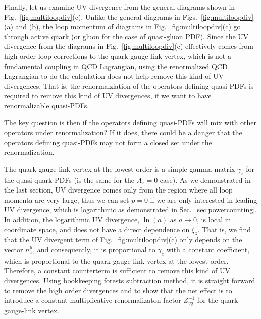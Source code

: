 \documentclass[twocolumn,aps,prd,superscriptaddress,nofootinbib,showpacs]{revtex4}
\begin{document}
Finally, let us examine UV divergence from the general diagrams shown in Fig.~\ref{fig:multiloopdiv}(c). Unlike the general diagrams in Figs.~\ref{fig:multiloopdiv}(a) and (b), the loop momentum of diagrams in Fig.~\ref{fig:multiloopdiv}(c) go through active quark (or gluon for the case of quasi-gluon PDF).  Since the UV divergence from the diagrams in Fig.~\ref{fig:multiloopdiv}(c) effectively comes from high order loop corrections to the quark-gauge-link vertex, which is not a fundamental coupling in QCD Lagrangian, using the renormalized QCD Lagrangian to do the calculation does not help remove this kind of UV divergences.  That is, the renormalziation of the operators defining quasi-PDFs is required to remove this kind of UV divergences, if we want to have renormalizable quasi-PDFs.

The key question is then if the operators defining quasi-PDFs will mix with other operators under renormalization? If it does, there could be a danger that the operators defining quasi-PDFs may not form a closed set under the renormalization.

The quark-gauge-link vertex at the lowest order is a simple gamma matrix $\gamma_z$ for the quasi-quark PDFs (is the same for the $A_z=0$ case). As we demonstrated in the last section, UV divergence comes only from the region where all loop momenta are very large, thus we can set $p=0$ if we are only interested in leading UV divergence, which is logarithmic as demonstrated in Sec.~\ref{sec:powercounting}. In addition, the logarithmic UV divergence, $\ln(a)$ as $a\to 0$, is local in coordinate space, and does not have a direct dependence on $\xi_z$.  That is, we find that the UV divergent term of Fig.~\ref{fig:multiloopdiv}(c) only depends on the vector $n_z^\mu$, and consequently, it is proportional to $\gamma_z$ with a constant coefficient, which is proportional to the quark-gauge-link vertex at the lowest order.  Therefore, a constant counterterm is sufficient to remove this kind of UV divergences. Using bookkeeping forests subtraction method, it is straight forward to remove the high order divergences and to show that the net effect is to introduce a constant multiplicative renormalizaton factor $Z_{vq}^{-1}$ for the quark-gauge-link vertex.
\end{document}
